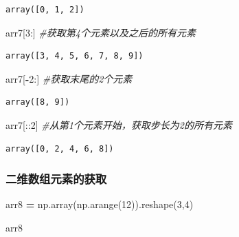 \documentclass[]{article}
\newenvironment{Shaded}{\begin{snugshade}}{\end{snugshade}}
\newcommand{\DecValTok}[1]{\textcolor[rgb]{0.00,0.00,0.81}{#1}}
\newcommand{\CommentTok}[1]{\textcolor[rgb]{0.56,0.35,0.01}{\textit{#1}}}
\newcommand{\OperatorTok}[1]{\textcolor[rgb]{0.81,0.36,0.00}{\textbf{#1}}}
\newcommand{\NormalTok}[1]{#1}
\begin{document}
\begin{verbatim}
array([0, 1, 2])
\end{verbatim}

\begin{Shaded}
\begin{Highlighting}[]
\NormalTok{arr7[}\DecValTok{3}\NormalTok{:] }\CommentTok{#获取第4个元素以及之后的所有元素}
\end{Highlighting}
\end{Shaded}

\begin{verbatim}
array([3, 4, 5, 6, 7, 8, 9])
\end{verbatim}

\begin{Shaded}
\begin{Highlighting}[]
\NormalTok{arr7[}\OperatorTok{-}\DecValTok{2}\NormalTok{:] }\CommentTok{#获取末尾的2个元素}
\end{Highlighting}
\end{Shaded}

\begin{verbatim}
array([8, 9])
\end{verbatim}

\begin{Shaded}
\begin{Highlighting}[]
\NormalTok{arr7[::}\DecValTok{2}\NormalTok{] }\CommentTok{#从第1个元素开始，获取步长为2的所有元素}
\end{Highlighting}
\end{Shaded}

\begin{verbatim}
array([0, 2, 4, 6, 8])
\end{verbatim}

\subsubsection{二维数组元素的获取}

\begin{Shaded}
\begin{Highlighting}[]
\NormalTok{arr8 }\OperatorTok{=}\NormalTok{ np.array(np.arange(}\DecValTok{12}\NormalTok{)).reshape(}\DecValTok{3}\NormalTok{,}\DecValTok{4}\NormalTok{)}
\end{Highlighting}
\end{Shaded}

\begin{Shaded}
\begin{Highlighting}[]
\NormalTok{arr8}
\end{Highlighting}
\end{Shaded}
\end{document}
